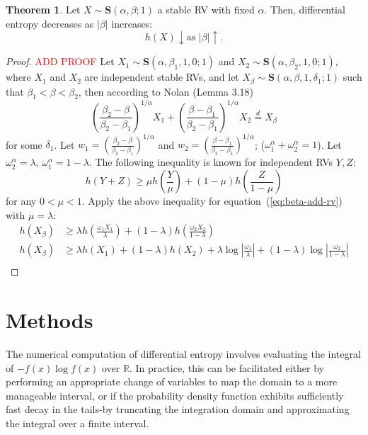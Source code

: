 \documentclass{article}
\theoremstyle{definition}
\newtheorem{theorem}[definition]{Theorem}
\begin{document}
\begin{theorem}
    Let \(X\sim\mathbf{S}(\alpha,\beta;1)\) a stable RV with fixed \(\alpha\). Then, differential entropy decreases as \(|\beta|\) increases:
    \begin{equation}
        h(X)\downarrow \text{as } |\beta| \uparrow.
    \end{equation}
\end{theorem}
\begin{proof}
    \textcolor{red}{ADD PROOF} Let \(X_1\sim\mathbf{S}(\alpha,\beta_1,1,0;1)\) and \(X_2\sim\mathbf{S}(\alpha,\beta_2,1,0;1)\), where \(X_1\) and \(X_2\) are independent stable RVs, and let \(X_\beta\sim\mathbf{S}(\alpha,\beta,1,\delta_1;1)\) such that \(\beta_1<\beta<\beta_2\), then according to Nolan (Lemma 3.18) \cite{NolanJohnP2020USDM}
    \begin{equation}\label{eq:beta-add-rv}
    \left( \frac{\beta_2-\beta}{\beta_2-\beta_1} \right)^{1/\alpha} X_1 + \left( \frac{\beta-\beta_1}{\beta_2-\beta_1} \right)^{1/\alpha} X_2 \overset{d}{=}X_\beta 
    \end{equation}
    for some \(\delta_1\). Let \(w_1=\left( \frac{\beta_2-\beta}{\beta_2-\beta_1} \right)^{1/\alpha}\) and \(w_2 = \left( \frac{\beta-\beta_1}{\beta_2-\beta_1} \right)^{1/\alpha}\); (\(\omega_1^\alpha+\omega_2^\alpha=1\)). Let \(\omega_2^\alpha=\lambda,\,\omega_1^\alpha=1-\lambda \).
    The following inequality is known for independent RVs \(Y,Z\):
    \[
    h(Y+Z) \ge \mu h\left(\frac{Y}{\mu}\right)+(1-\mu)h\left( \frac{Z}{1-\mu} \right)
    \]
    for any \(0<\mu<1\). Apply the above inequality for equation~(\ref{eq:beta-add-rv}) with \(\mu=\lambda\):
    \begin{align*}
        h(X_\beta)&\ge\lambda h\left( \frac{\omega_1X_1}{\lambda} \right) + (1-\lambda) h\left( \frac{\omega_2X_2}{1-\lambda} \right)\\
        h(X_\beta)&\ge\lambda h( X_1 ) + (1-\lambda) h(X_2) + \lambda\log \left|\frac{\omega_1}{\lambda}\right| + (1-\lambda) \log \left|  \frac{\omega_2}{1-\lambda} \right|\\
    \end{align*}
\end{proof}


\section{Methods}
The numerical computation of differential entropy involves evaluating the integral of \(-f(x)\log f(x)\) over \(\mathbb{R}\). In practice, this can be facilitated either by performing an appropriate change of variables to map the domain to a more manageable interval, or if the probability density function exhibits sufficiently fast decay in the tails-by truncating the integration domain and approximating the integral over a finite interval.
\end{document}
